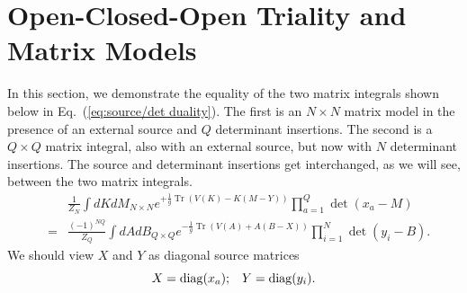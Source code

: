 \documentclass[english]{article}
\DeclareMathOperator{\Tr}{Tr}
\begin{document}








\section{Open-Closed-Open Triality and Matrix Models} \label{sec:twostacks}

In this section, we demonstrate the equality of the two matrix integrals shown below in Eq.~(\ref{eq:source/det duality}). The first is an $N \times N$ matrix model in the presence of an external source and $Q$ determinant insertions. The second is a $Q \times Q$ matrix integral, also with an external source, but now with $N$ determinant insertions. The source and determinant insertions get interchanged, as we will see, between the two matrix integrals.     
\begin{eqnarray} \label{eq:source/det duality}
   & &\frac{1}{Z_{N}}  \int dK dM_{N \times N} e^{+ \frac{1}{g} \Tr \left( V(K) - K(M-Y) \right)} \prod_{a=1}^{Q} \det(x_{a}-M)  \nonumber \\
     & = & \frac{(-1)^{NQ}}{Z_{Q}}\int dA dB_{Q \times Q} e^{- \frac{1}{g} \Tr \left( V(A) + A(B-X) \right)} \prod_{i=1}^{N} \det(y_{i}-B). 
\end{eqnarray}
We should view $X$ and $Y$ as diagonal source matrices
\begin{equation}
X={\rm diag}(x_a) ; \,\,\,\,\, Y={\rm diag} (y_i) .    
\end{equation}
\end{document}
